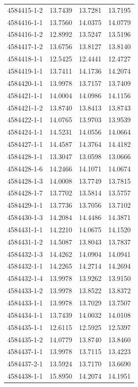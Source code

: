 \begin{longtable}{lrrr}
4584415-1-2 & 13.7439 & 13.7281 & 13.7195 \\
4584416-1-1 & 13.7560 & 14.0375 & 14.0779 \\
4584416-1-2 & 12.8992 & 13.5247 & 13.5196 \\
4584417-1-2 & 13.6756 & 13.8127 & 13.8140 \\
4584418-1-1 & 12.5425 & 12.4441 & 12.4727 \\
4584419-1-1 & 13.7411 & 14.1736 & 14.2074 \\
4584420-1-1 & 13.9978 & 13.7157 & 13.7409 \\
4584421-1-1 & 14.0004 & 14.0986 & 14.1156 \\
4584421-1-2 & 13.8740 & 13.8413 & 13.8743 \\
4584422-1-1 & 14.0765 & 13.9703 & 13.9539 \\
4584424-1-1 & 14.5231 & 14.0556 & 14.0664 \\
4584427-1-1 & 14.4587 & 14.3764 & 14.4182 \\
4584428-1-1 & 13.3047 & 13.0598 & 13.0666 \\
4584428-1-6 & 14.2466 & 14.1071 & 14.0674 \\
4584428-1-3 & 14.0008 & 13.7749 & 13.7815 \\
4584428-1-7 & 13.7702 & 13.5814 & 13.5757 \\
4584429-1-1 & 13.7736 & 13.7056 & 13.7102 \\
4584430-1-3 & 14.2084 & 14.4486 & 14.3871 \\
4584431-1-1 & 14.2210 & 14.0675 & 14.1520 \\
4584431-1-2 & 14.5087 & 13.8043 & 13.7837 \\
4584432-1-3 & 14.4262 & 14.0904 & 14.0941 \\
4584432-1-1 & 14.2265 & 14.2714 & 14.2694 \\
4584432-1-4 & 13.9978 & 13.9262 & 13.9150 \\
4584433-1-2 & 13.9978 & 13.8522 & 13.8372 \\
4584433-1-1 & 13.9978 & 13.7029 & 13.7507 \\
4584434-1-1 & 13.7439 & 14.0032 & 14.0108 \\
4584435-1-1 & 12.6115 & 12.5925 & 12.5397 \\
4584435-1-2 & 14.0779 & 13.8740 & 13.8460 \\
4584437-1-1 & 13.9978 & 13.7115 & 13.4223 \\
4584437-2-1 & 13.5924 & 13.7170 & 13.6690 \\
4584438-1-1 & 15.8950 & 14.2074 & 14.1951 \\

\end{longtable}
